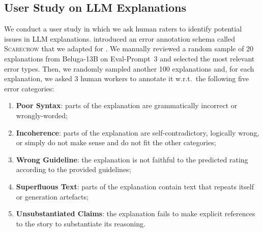 \subsection{User Study on LLM Explanations}
\label{sub:llm_user_study}

We conduct a user study in which we ask human raters to identify potential issues in LLM explanations. \citet{dou-etal-2022-gpt} introduced an error annotation schema called \textsc{Scarecrow} that we adapted for \asefull. We manually reviewed a random sample of 20 explanations from Beluga-13B on Eval-Prompt~3 and selected the most relevant error types. Then, we randomly sampled another 100 explanations and, for each explanation, we asked 3 human workers to annotate it w.r.t.\ the following five error categories:
\begin{enumerate}
    \item \textbf{Poor Syntax}: parts of the explanation are grammatically incorrect or wrongly-worded;
    \item \textbf{Incoherence}: parts of the explanation are self-contradictory, logically wrong, or simply do not make sense and do not fit the other categories;
    \item \textbf{Wrong Guideline}: the explanation is not faithful to the predicted rating according to the provided guidelines;
    \item \textbf{Superfluous Text}: parts of the explanation contain text that repeats itself or generation artefacts;
    \item \textbf{Unsubstantiated Claims}: the explanation fails to make explicit references to the story to substantiate its reasoning.
\end{enumerate}

